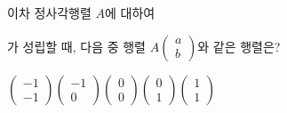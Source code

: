 \hspace*{2mm}\begin{minipage}[t]{\dimexpr\linewidth-2mm\relax}\vspace{0pt}
이차 정사각행렬 $A$에 대하여 \par\smallskip{}\par\smallskip\noindent 가 성립할 때, 다음 중 행렬 $A\begin{pmatrix} a \\ b \end{pmatrix}$와 같은 행렬은?
\begin{choices32}{$\begin{pmatrix} -1 \\ -1 \end{pmatrix}$}{$\begin{pmatrix} -1 \\ 0 \end{pmatrix}$}{$\begin{pmatrix} 0 \\ 0 \end{pmatrix}$}{$\begin{pmatrix} 0 \\ 1 \end{pmatrix}$}{$\begin{pmatrix} 1 \\ 1 \end{pmatrix}$}\end{choices32}\end{minipage}
